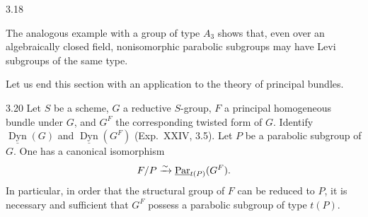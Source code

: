 \begin{remark}{3.18}
\begin{enumeratei}
The analogous example with a group of type $A_3$ shows that, even over an algebraically closed field, nonisomorphic parabolic subgroups may have Levi subgroups of the same type.
\end{enumeratei}
\end{remark}
Let us end this section with an application to the theory of principal bundles.
\begin{lemma}{3.20}\label{XXVI.3.20}
Let $S$ be a scheme, $G$ a reductive $S$-group, $F$ a principal homogeneous bundle under $G$, and $G^F$ the corresponding twisted form of $G$. Identify $\underline{\operatorname{Dyn}}(G)$ and $\underline{\operatorname{Dyn}}(G^F)$ (Exp.~XXIV, 3.5). Let $P$ be a parabolic subgroup of $G$. One has a canonical isomorphism
\[
F/P\xrightarrow{\sim}\underline{\operatorname{Par}}_{t(P)}(G^F).
\]
In particular, in order that the structural group of $F$ can be reduced to $P$, it is necessary and sufficient that $G^F$ possess a parabolic subgroup of type $t(P)$.
\end{lemma}


